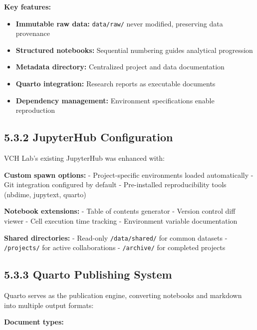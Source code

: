 \documentclass[
  oneside,
  open=any]{scrbook}
\providecommand{\tightlist}{%
  \setlength{\itemsep}{0pt}\setlength{\parskip}{0pt}}\usepackage{longtable,booktabs,array}
\begin{document}
\textbf{Key features:}

\begin{itemize}
\tightlist
\item
  \textbf{Immutable raw data:} \texttt{data/raw/} never modified,
  preserving data provenance
\item
  \textbf{Structured notebooks:} Sequential numbering guides analytical
  progression
\item
  \textbf{Metadata directory:} Centralized project and data
  documentation
\item
  \textbf{Quarto integration:} Research reports as executable documents
\item
  \textbf{Dependency management:} Environment specifications enable
  reproduction
\end{itemize}

\subsection{5.3.2 JupyterHub
Configuration}\label{jupyterhub-configuration}

VCH Lab's existing JupyterHub was enhanced with:

\textbf{Custom spawn options:} - Project-specific environments loaded
automatically - Git integration configured by default - Pre-installed
reproducibility tools (nbdime, jupytext, quarto)

\textbf{Notebook extensions:} - Table of contents generator - Version
control diff viewer - Cell execution time tracking - Environment
variable documentation

\textbf{Shared directories:} - Read-only \texttt{/data/shared/} for
common datasets - \texttt{/projects/} for active collaborations -
\texttt{/archive/} for completed projects

\subsection{5.3.3 Quarto Publishing
System}\label{quarto-publishing-system}

Quarto serves as the publication engine, converting notebooks and
markdown into multiple output formats:

\textbf{Document types:}
\end{document}

